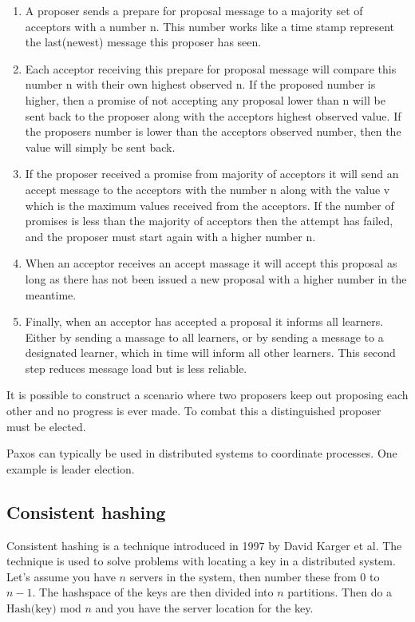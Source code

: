 \begin{enumerate}

\item A proposer sends a prepare for proposal message to a majority set of acceptors with a number n. This number works like a time stamp represent the last(newest) message this proposer has seen. 
\item Each acceptor receiving this prepare for proposal message will compare this number n with their own highest observed n. If the proposed number is higher, then a promise of not accepting any proposal lower than n will be sent back to the proposer along with the acceptors highest observed value. If the proposers number is lower than the acceptors observed number, then the value will simply be sent back. 
\item If the proposer received a promise from majority of acceptors it will send an accept message to the acceptors with the number n along with the value v which is the maximum values received from the acceptors. If the number of promises is less than the majority of acceptors then the attempt has failed, and the proposer must start again with a higher number n.
\item When an acceptor receives an accept massage it will accept this proposal as long as there has not been issued a new proposal with a higher number in the meantime. 
\item Finally, when an acceptor has accepted a proposal it informs all learners. Either by sending a massage to all learners, or by sending a message to a designated learner, which in time will inform all other learners. This second step reduces message load but is less reliable.

\end{enumerate}

It is possible to construct a scenario where two proposers keep out proposing each other and no progress is ever made. To combat this a distinguished proposer must be elected. 

Paxos can typically be used in distributed systems to coordinate processes. One example is leader election.




\subsection{Consistent hashing}
\label{sec:consistenthashing}
Consistent hashing is a technique introduced in 1997 by David Karger et al.\cite{Karger97consistenthashing}
The technique is used to solve problems with locating a key in a distributed system.
Let's assume you have $n$ servers in the system, then number these from $0$ to $n-1$.
The hashspace of the keys are then divided into $n$ partitions. Then do a $\textrm{Hash(key) mod } n$ and you have the server location for the key.

